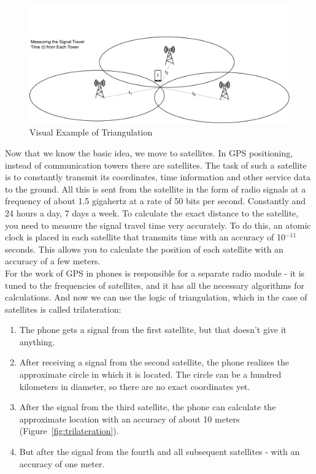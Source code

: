 \documentclass[10pt,oneside,english,a4paper]{article}
\begin{document}
\begin{figure}[h]
	\centering
	\includegraphics[scale=0.3]{diagram2.pdf}
	\caption{Visual Example of Triangulation}
	\label{fig:triangulation}
\end{figure}

Now that we know the basic idea, we move to satellites. In GPS positioning, instead of communication towers there are satellites. The task of such a satellite is to constantly transmit its coordinates, time information and other service data to the ground. All this is sent from the satellite in the form of radio signals at a frequency of about 1.5 gigahertz at a rate of 50 bits per second. Constantly and 24 hours a day, 7 days a week. To calculate the exact distance to the satellite, you need to measure the signal travel time very accurately. To do this, an atomic clock is placed in each satellite that transmits time with an accuracy of 10$^{-11}$ seconds. This allows you to calculate the position of each satellite with an accuracy of a few meters. 
\\For the work of GPS in phones is responsible for a separate radio module - it is tuned to the frequencies of satellites, and it has all the necessary algorithms for calculations. And now we can use the logic of triangulation, which in the case of satellites is called trilateration\cite{Bajaj2002}:

\begin{enumerate}
\item The phone gets a signal from the first satellite, but that doesn't give it anything.
\item After receiving a signal from the second satellite, the phone realizes the approximate circle in which it is located. The circle can be a hundred kilometers in diameter, so there are no exact coordinates yet.
\item After the signal from the third satellite, the phone can calculate the approximate location with an accuracy of about 10 meters (Figure~\ref{fig:trilateration}).
\item But after the signal from the fourth and all subsequent satellites - with an accuracy of one meter.
\end{enumerate}
\end{document}
